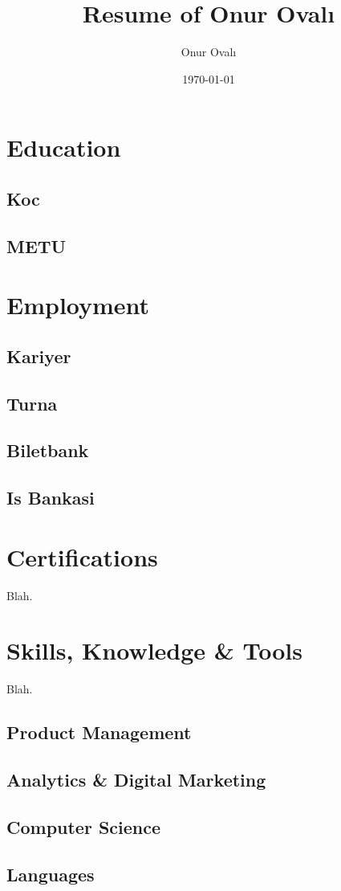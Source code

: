 \documentclass[11pt,twoside,a4paper]{article}
\title{Resume of Onur Ovalı}
\author{Onur Ovalı}
\date{\today}
\begin{document}
  \maketitle

  \section{Education}
    \subsection{Koc}
    \subsection{METU}

  \section{Employment}
    \subsection{Kariyer}
    \subsection{Turna}
    \subsection{Biletbank}
    \subsection{Is Bankasi}

  \section{Certifications}
  Blah.

  \section{Skills, Knowledge \& Tools}
  Blah.
    \subsection{Product Management}
    \subsection{Analytics \& Digital Marketing}
    \subsection{Computer Science}
    \subsection{Languages}
\end{document}
